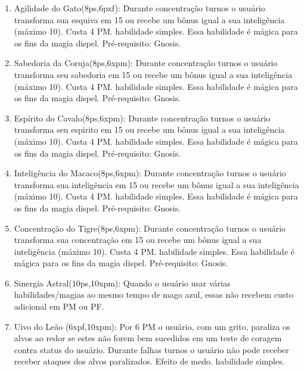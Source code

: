 \begin{enumerate}
	\item Agilidade do Gato(8ps,6pxf): Durante concentração turnos o usuário transforma sua esquiva em 15 ou recebe um bônus igual a sua inteligência (máximo 10). Custa 4 PM. habilidade simples. Essa habilidade é mágica para os fins da magia dispel. Pré-requisito: Gnosis.

	\item Sabedoria da Coruja(8ps,6xpm): Durante concentração turnos o usuário transforma seu sabedoria em 15 ou recebe um bônus igual a sua inteligência (máximo 10). Custa 4 PM. habilidade simples. Essa habilidade é mágica para os fins da magia dispel. Pré-requisito: Gnosis.

	\item Espírito do Cavalo(8ps,6xpm): Durante concentração turnos o usuário transforma seu espirito em 15 ou recebe um bônus igual a sua inteligência (máximo 10). Custa 4 PM. habilidade simples. Essa habilidade é mágica para os fins da magia dispel. Pré-requisito: Gnosis.

	\item Inteligência do Macaco(8ps,6xpm): Durante concentração turnos o usuário transforma sua inteligência em 15 ou recebe um bônus igual a sua inteligência (máximo 10). Custa 4 PM. habilidade simples. Essa habilidade é mágica para os fins da magia dispel. Pré-requisito: Gnosis.

	\item Concentração do Tigre(8ps,6xpm): Durante concentração turnos o usuário transforma sua concentração em 15 ou recebe um bônus igual a sua inteligência (máximo 10). Custa 4 PM. habilidade simples. Essa habilidade é mágica para os fins da magia dispel. Pré-requisito: Gnosis.

	\item Sinergia Astral(10ps,10xpm): Quando o usuário usar várias habilidades/magias ao mesmo tempo de mago azul, essas não recebem custo adicional em PM ou PF. 

	\item Uivo do Leão (6xpf,10xpm): Por 6 PM o usuário, com um grito, paraliza os alvos ao redor se estes não forem bem sucedidos em um teste de coragem contra status do usuário. Durante falhas turnos o usuário não pode receber receber ataques dos alvos paralizados. Efeito de medo. habilidade simples.


\end{enumerate}
